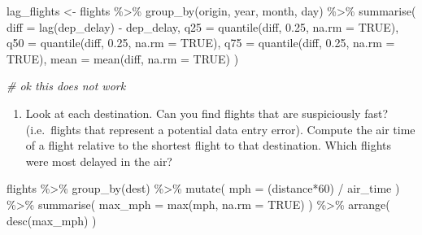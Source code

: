 \documentclass[
]{article}
\newenvironment{Shaded}{\begin{snugshade}}{\end{snugshade}}
\newcommand{\AttributeTok}[1]{\textcolor[rgb]{0.77,0.63,0.00}{#1}}
\newcommand{\CommentTok}[1]{\textcolor[rgb]{0.56,0.35,0.01}{\textit{#1}}}
\newcommand{\ConstantTok}[1]{\textcolor[rgb]{0.00,0.00,0.00}{#1}}
\newcommand{\DecValTok}[1]{\textcolor[rgb]{0.00,0.00,0.81}{#1}}
\newcommand{\FloatTok}[1]{\textcolor[rgb]{0.00,0.00,0.81}{#1}}
\newcommand{\FunctionTok}[1]{\textcolor[rgb]{0.00,0.00,0.00}{#1}}
\newcommand{\NormalTok}[1]{#1}
\newcommand{\OtherTok}[1]{\textcolor[rgb]{0.56,0.35,0.01}{#1}}
\newcommand{\SpecialCharTok}[1]{\textcolor[rgb]{0.00,0.00,0.00}{#1}}
\providecommand{\tightlist}{%
  \setlength{\itemsep}{0pt}\setlength{\parskip}{0pt}}
\begin{document}
\begin{Shaded}
\begin{Highlighting}[]
\NormalTok{lag\_flights }\OtherTok{\textless{}{-}}\NormalTok{ flights }\SpecialCharTok{\%\textgreater{}\%} 
  \FunctionTok{group\_by}\NormalTok{(origin, year, month, day) }\SpecialCharTok{\%\textgreater{}\%} 
  \FunctionTok{summarise}\NormalTok{( }\AttributeTok{diff =} \FunctionTok{lag}\NormalTok{(dep\_delay) }\SpecialCharTok{{-}}\NormalTok{ dep\_delay,}
             \AttributeTok{q25 =} \FunctionTok{quantile}\NormalTok{(diff, }\FloatTok{0.25}\NormalTok{, }\AttributeTok{na.rm =} \ConstantTok{TRUE}\NormalTok{),}
             \AttributeTok{q50 =} \FunctionTok{quantile}\NormalTok{(diff, }\FloatTok{0.25}\NormalTok{, }\AttributeTok{na.rm =} \ConstantTok{TRUE}\NormalTok{),}
             \AttributeTok{q75 =} \FunctionTok{quantile}\NormalTok{(diff, }\FloatTok{0.25}\NormalTok{, }\AttributeTok{na.rm =} \ConstantTok{TRUE}\NormalTok{),}
             \AttributeTok{mean =} \FunctionTok{mean}\NormalTok{(diff, }\AttributeTok{na.rm =} \ConstantTok{TRUE}\NormalTok{) )}

\CommentTok{\# ok this does not work}
\end{Highlighting}
\end{Shaded}

\begin{enumerate}
\def\labelenumi{\arabic{enumi}.}
\tightlist
\item
  Look at each destination. Can you find flights that are suspiciously
  fast? (i.e.~flights that represent a potential data entry error).
  Compute the air time of a flight relative to the shortest flight to
  that destination. Which flights were most delayed in the air?
\end{enumerate}

\begin{Shaded}
\begin{Highlighting}[]
\NormalTok{flights }\SpecialCharTok{\%\textgreater{}\%} 
  \FunctionTok{group\_by}\NormalTok{(dest) }\SpecialCharTok{\%\textgreater{}\%} 
  \FunctionTok{mutate}\NormalTok{( }\AttributeTok{mph =}\NormalTok{  (distance}\SpecialCharTok{*}\DecValTok{60}\NormalTok{) }\SpecialCharTok{/}\NormalTok{ air\_time ) }\SpecialCharTok{\%\textgreater{}\%} 
  \FunctionTok{summarise}\NormalTok{( }\AttributeTok{max\_mph =} \FunctionTok{max}\NormalTok{(mph, }\AttributeTok{na.rm =} \ConstantTok{TRUE}\NormalTok{) ) }\SpecialCharTok{\%\textgreater{}\%} 
  \FunctionTok{arrange}\NormalTok{( }\FunctionTok{desc}\NormalTok{(max\_mph) )}
\end{Highlighting}
\end{Shaded}
\end{document}

